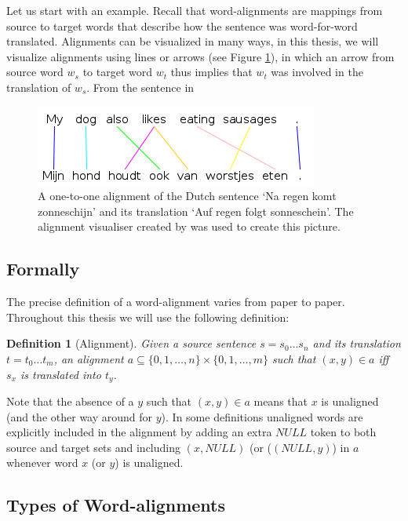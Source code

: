 \documentclass{report}
\theoremstyle{definition}
\theoremstyle{plain}
\newtheorem{definition}{Definition}
\begin{document}
Let us start with an example. Recall that word-alignments are mappings from source to target words that describe how the sentence was word-for-word translated. Alignments can be visualized in many ways, in this thesis, we will visualize alignments using lines or arrows (see Figure \ref{fig:alignment}), in which an arrow from source word $w_s$ to target word $w_t$ thus implies that $w_t$ was involved in the translation of $w_s$. From the sentence in 


\begin{figure}[!ht]
\centering
\includegraphics[scale=0.6]{alignment.png}
\caption{A one-to-one alignment of the Dutch sentence `Na regen komt zonneschijn' and its translation `Auf regen folgt sonneschein'. The alignment visualiser created by \cite{maillette2010visualizing} was used to create this picture.
}\label{fig:alignment}
\end{figure}


\subsection{Formally}

The precise definition of a word-alignment varies from paper to paper. Throughout this thesis we will use the following definition:

\begin{definition}[Alignment]
Given a source sentence $s = s_0 \ldots s_n$ and its translation $t = t_0 \ldots t_m$, an alignment $a \subseteq \{0,1,\ldots,n\} \times \{0,1,\ldots,m\}$ such that $(x,y)\in a$ iff $s_x$ is translated into $t_y$.
\end{definition}

Note that the absence of a $y$ such that $(x,y)\in a$ means that $x$ is unaligned (and the other way around for $y$). In some definitions unaligned words are explicitly included in the alignment by adding an extra $NULL$ token to both source and target sets and including $(x,NULL)$ (or ($(NULL,y)$) in $a$ whenever word $x$ (or $y$) is unaligned.


\subsection{Types of Word-alignments}
\end{document}
